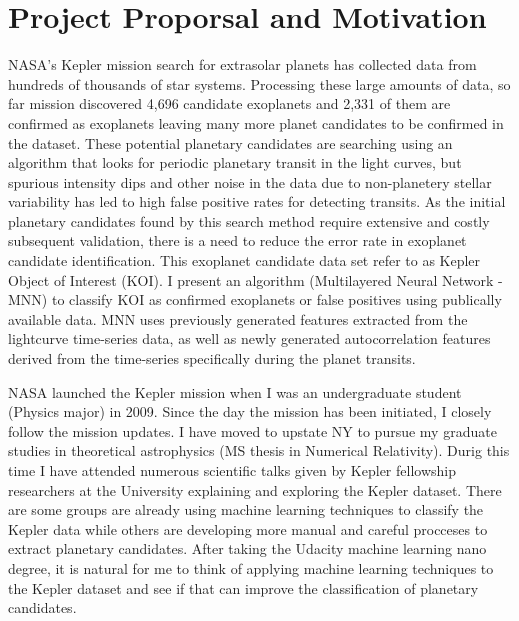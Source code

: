 \section{Project  Proporsal and Motivation}
NASA's Kepler mission search for extrasolar planets has collected data from hundreds of thousands of star systems. Processing these large amounts of data, so far mission discovered 4,696 candidate exoplanets and 2,331 of them are confirmed as exoplanets leaving many more planet candidates to be confirmed in the dataset. These potential planetary candidates are searching using an algorithm that looks for periodic planetary transit in the light curves, but spurious intensity dips and other noise in the data due to non-planetery stellar variability has led to high false positive rates for detecting transits. As the initial planetary candidates found by this search method require extensive and costly subsequent validation, there is a need to reduce the error rate in exoplanet candidate identification. This exoplanet candidate data set refer to as Kepler Object of Interest (KOI). I present an algorithm (Multilayered Neural Network - MNN) to classify KOI as confirmed exoplanets or false positives using publically available data. MNN uses previously generated features extracted from the lightcurve time-series data, as well as newly generated autocorrelation features derived from the time-series specifically during the planet transits. 

NASA launched the Kepler mission when I was an undergraduate student (Physics major) in 2009. Since the day the mission has been initiated, I closely follow the mission updates.  I have moved to upstate NY to pursue my graduate studies in theoretical astrophysics (MS thesis in Numerical Relativity). Durig this time I have attended numerous scientific talks given by Kepler fellowship researchers at the University explaining and exploring the Kepler dataset. There are some groups are already using machine learning techniques to classify the Kepler data while others are developing more manual and careful procceses to extract planetary candidates. After taking the Udacity machine learning nano degree, it is natural for me to think of applying machine learning techniques to the Kepler dataset and see if that can improve the classification of planetary candidates. 
